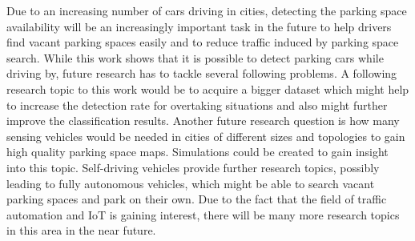 Due to an increasing number of cars driving in cities, detecting the parking space availability will be an increasingly important task in the future to help drivers find vacant parking spaces easily and to reduce traffic induced by parking space search. While this work shows that it is possible to detect parking cars while driving by, future research has to tackle several following problems. A following research topic to this work would be to acquire a bigger dataset which might help to increase the detection rate for overtaking situations and also might further improve the classification results. Another future research question is how many sensing vehicles would be needed in cities of different sizes and topologies to gain high quality parking space maps. Simulations could be created to gain insight into this topic. Self-driving vehicles provide further research topics, possibly leading to fully autonomous vehicles, which might be able to search vacant parking spaces and park on their own.  Due to the fact that the field of traffic automation and IoT is gaining interest, there will be many more research topics in this area in the near future.









